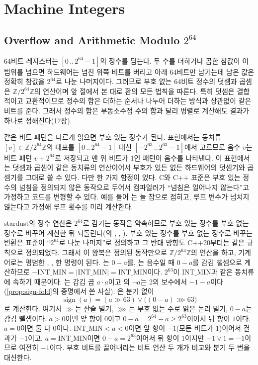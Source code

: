\section{Machine Integers}
\label{sec:machine-int}

\subsection{Overflow and Arithmetic Modulo $2^{64}$}

64비트 레지스터는 $[0\,..\,2^{64}-1]$의 정수를 담는다. 두 수를 더하거나 곱한 참값이 이 범위를 넘으면 하드웨어는 넘친 위쪽 비트를 버리고 아래 64비트만 남기는데 남은 값은 정확히 참값을 $2^{64}$로 나눈 나머지이다. 그러므로 부호 없는 64비트 정수의 덧셈과 곱셈은 $\mathbb{Z}/2^{64}\mathbb{Z}$의 연산이며 앞 절에서 본 대로 환의 모든 법칙을 따른다. 특히 덧셈은 결합적이고 교환적이므로 정수의 합은 더하는 순서나 나누어 더하는 방식과 상관없이 같은 비트를 준다. 그래서 정수의 합은 부동소수점 수의 합과 달리 병렬로 계산해도 결과가 하나로 정해진다(17장).

같은 비트 패턴을 다르게 읽으면 부호 있는 정수가 된다.  표현에서는 동치류 $[v]\in\mathbb{Z}/2^{64}\mathbb{Z}$의 대표를 $[0\,..\,2^{64}-1]$ 대신 $[-2^{63}\,..\,2^{63}-1]$에서 고르므로 음수 $v$는 비트 패턴 $v+2^{64}$로 저장되고 맨 위 비트가 $1$인 패턴이 음수를 나타낸다. 이 표현에서는 덧셈과 곱셈이 같은 동치류의 연산이어서 부호가 있든 없든 하드웨어의 덧셈기와 곱셈기를 그대로 쓸 수 있다. 다만 한 가지 함정이 있다. C와 C++ 표준은 부호 있는 정수의 넘침을 정의되지 않은 동작으로 두어서\cite{iso14882-2020} 컴파일러가 ``넘침은 일어나지 않는다''고 가정하고 코드를 변형할 수 있다\cite{lattner2011ub}. 예를 들어 는 늘 참으로 접히고, 루프 변수가 넘치지 않는다고 가정해 루프 횟수를 미리 계산한다.

stardust의 정수 연산은 $2^{64}$로 감기는 동작을 약속하므로 부호 있는 정수를 부호 없는 정수로 바꾸어 계산한 뒤 되돌린다(의 , , ). 부호 있는 정수를 부호 없는 정수로 바꾸는 변환은 표준이 ``$2^{64}$로 나눈 나머지''로 정의하고 그 반대 방향도 C++20부터는 같은 규칙으로 정의되었다. 그래서 이 왕복은 정의된 동작만으로 $\mathbb{Z}/2^{64}\mathbb{Z}$의 연산을 하고, 기계어로는 평범한 , ,  한 명령이 된다. 는 $0-a$를, 는 음수일 때 $0-a$를 감김 뺄셈으로 계산하므로 $-\mathrm{INT\_MIN}=|\mathrm{INT\_MIN}|=\mathrm{INT\_MIN}$이다. $2^{63}$이 $\mathrm{INT\_MIN}$과 같은 동치류에 속하기 때문이다. 는 감김 곱 $a\cdot a$이고 의 $\lnot a$는 2의 보수에서 $-1-a$이다(\cref{prop:sign-fold}의 증명에서 쓴 사실). 은 분기 없이
\[
\operatorname{sign}(a)=(a\gg63)\lor\bigl((0-a)\ggg63\bigr)
\]
로 계산한다. 여기서 $\gg$는 산술 밀기, $\ggg$는 부호 없는 수로 읽은 논리 밀기, $0-a$는 감김 뺄셈이다. $a>0$이면 앞 항이 $0$이고 $0-a=2^{64}-a\ge2^{63}$이어서 뒤 항이 $1$이다. $a=0$이면 둘 다 $0$이다. $\mathrm{INT\_MIN}<a<0$이면 앞 항이 $-1$(모든 비트가 $1$)이어서 결과가 $-1$이고, $a=\mathrm{INT\_MIN}$이면 $0-a=2^{63}$이어서 뒤 항이 $1$이지만 $-1\lor1=-1$이므로 여전히 $-1$이다. 부호 비트를 끌어내리는 비트 연산 두 개가 비교와 분기 두 번을 대신한다.

